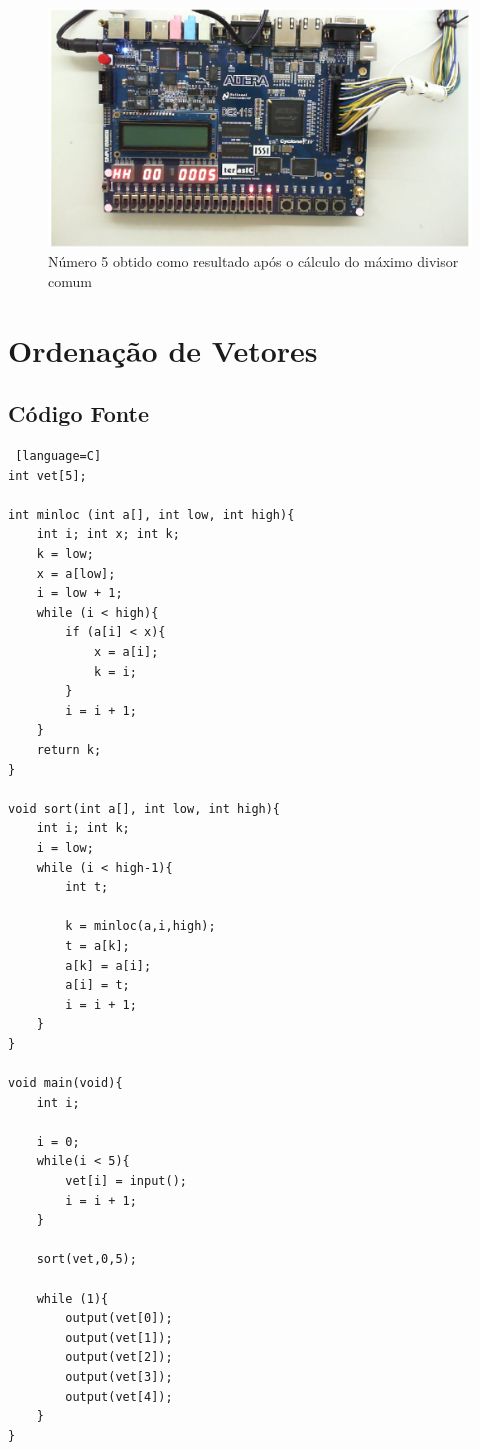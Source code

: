 \documentclass[
	12pt,				%
	oneside,
	a4paper,			%
	english,			%
	french,				%
	spanish,			%
	brazil,				%
	]{abntex2}
\begin{document}
\begin{figure}[H]
\centering 
\caption{Número 5 obtido como resultado após o cálculo do máximo divisor comum} 
\label{fig:FPGAMDCSaida}
\graphicspath{ {./imgs/} } 
\includegraphics[scale=0.4]{imgs/Resultados/MDC_FPGA_Saida.png}
\end{figure}

\section{Ordenação de Vetores}

\subsection{Código Fonte}

\begin{lstlisting} [language=C]
int vet[5];

int minloc (int a[], int low, int high){   
    int i; int x; int k;
    k = low;
    x = a[low];
    i = low + 1;
    while (i < high){
        if (a[i] < x){
            x = a[i];
            k = i;
        }
        i = i + 1;
    }
    return k;
}

void sort(int a[], int low, int high){   
    int i; int k;
    i = low;
    while (i < high-1){
        int t;
        
        k = minloc(a,i,high);
        t = a[k];
        a[k] = a[i];
        a[i] = t;
        i = i + 1;
    }
}

void main(void){	
    int i;
    
    i = 0;
    while(i < 5){
        vet[i] = input();
        i = i + 1;
    }
    
    sort(vet,0,5);
    
    while (1){
        output(vet[0]);
        output(vet[1]);
        output(vet[2]);
        output(vet[3]);
        output(vet[4]);
    }
}
\end{lstlisting}
\end{document}
